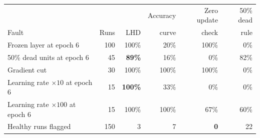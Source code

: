 \begin{tabular}{@{}lrrrrr@{}}
\toprule
 & & & Accuracy & Zero update & 50\% dead \\
Fault & Runs & LHD & curve & check & rule \\
\midrule
Frozen layer at epoch 6 & 100 & 100\% & 20\% & 100\% & 0\% \\
50\% dead units at epoch 6 & 45 & \textbf{89\%} & 16\% & 0\% & 82\% \\
Gradient cut & 30 & 100\% & 100\% & 100\% & 0\% \\
Learning rate $\times 10$ at epoch 6 & 15 & \textbf{100\%} & 33\% & 0\% & 0\% \\
Learning rate $\times 100$ at epoch 6 & 15 & 100\% & 100\% & 67\% & 60\% \\
\midrule
Healthy runs flagged & 150 & 3 & 7 & \textbf{0} & 22 \\
\bottomrule
\end{tabular}
